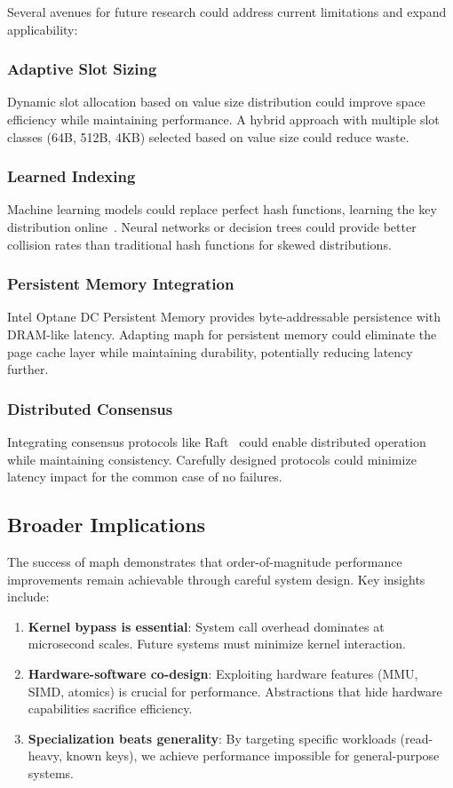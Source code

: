 \documentclass[10pt,conference]{IEEEtran}
\begin{document}
Several avenues for future research could address current limitations and expand applicability:

\subsubsection{Adaptive Slot Sizing}
Dynamic slot allocation based on value size distribution could improve space efficiency while maintaining performance. A hybrid approach with multiple slot classes (64B, 512B, 4KB) selected based on value size could reduce waste.

\subsubsection{Learned Indexing}
Machine learning models could replace perfect hash functions, learning the key distribution online~\cite{learned-index}. Neural networks or decision trees could provide better collision rates than traditional hash functions for skewed distributions.

\subsubsection{Persistent Memory Integration}
Intel Optane DC Persistent Memory provides byte-addressable persistence with DRAM-like latency. Adapting maph for persistent memory could eliminate the page cache layer while maintaining durability, potentially reducing latency further.

\subsubsection{Distributed Consensus}
Integrating consensus protocols like Raft~\cite{raft} could enable distributed operation while maintaining consistency. Carefully designed protocols could minimize latency impact for the common case of no failures.

\subsection{Broader Implications}

The success of maph demonstrates that order-of-magnitude performance improvements remain achievable through careful system design. Key insights include:

\begin{enumerate}
\item \textbf{Kernel bypass is essential}: System call overhead dominates at microsecond scales. Future systems must minimize kernel interaction.

\item \textbf{Hardware-software co-design}: Exploiting hardware features (MMU, SIMD, atomics) is crucial for performance. Abstractions that hide hardware capabilities sacrifice efficiency.

\item \textbf{Specialization beats generality}: By targeting specific workloads (read-heavy, known keys), we achieve performance impossible for general-purpose systems.
\end{enumerate}
\end{document}
